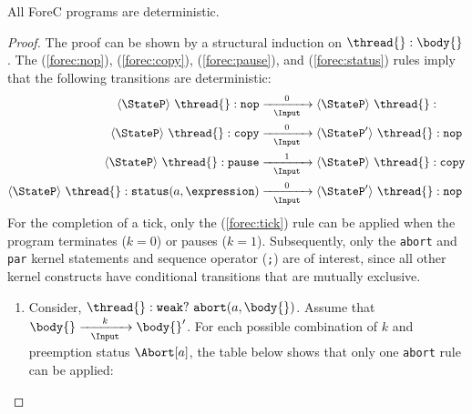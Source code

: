 \begin{theorem}
	\label{thm:deterministic}
	All ForeC programs are deterministic. 
\end{theorem}
\begin{proof}
	The proof can be shown by a structural induction on $\thread{}:\body{}$.
	The (\ref{forec:nop}), (\ref{forec:copy}), (\ref{forec:pause}), and (\ref{forec:status})
	rules imply that the following transitions are deterministic:
	\begin{align*}
		\langle \StateP \rangle ~ \thread{}:\mathtt{nop}
		&	\xrightarrow[~~\Input~~]{0} 
		\langle \StateP \rangle ~ \thread{}:									\\
		\langle \StateP \rangle ~ \thread{}:\mathtt{copy}
		&	\xrightarrow[~~\Input~~]{0} 
		\langle \StateP' \rangle ~ \thread{}:\mathtt{nop}						\\
		\langle \StateP \rangle ~ \thread{}:\mathtt{pause}
		&	\xrightarrow[~~\Input~~]{1} 
		\langle \StateP \rangle ~ \thread{}:\mathtt{copy}						\\
		\langle \StateP \rangle ~ \thread{}:\mathtt{status}(a, \expression)
		&	\xrightarrow[~~\Input~~]{0} 
		\langle \StateP' \rangle ~ \thread{}:\mathtt{nop}
	\end{align*}
	For the completion of a tick, only the (\ref{forec:tick})
	rule can be applied when the program terminates 
	($k = 0$) or pauses ($k = 1$). Subsequently, only the \verb$abort$ and 
	\verb$par$ kernel statements and sequence operator (\verb$;$) are 
	of interest, since all other kernel constructs have 
	conditional transitions that are mutually exclusive.
	\begin{enumerate}
		\item Consider, $\thread{}:\mathtt{weak}?~\mathtt{abort}(a, \body{})$. 
			  Assume that $\body{} \xrightarrow[~~\Input~~]{k} \body{}'$.
			  For each possible combination of $k$ and preemption status
			  $\Abort[a]$, the table below shows that only one \verb$abort$
			  rule can be applied:
			  

\end{enumerate}
\end{proof}
